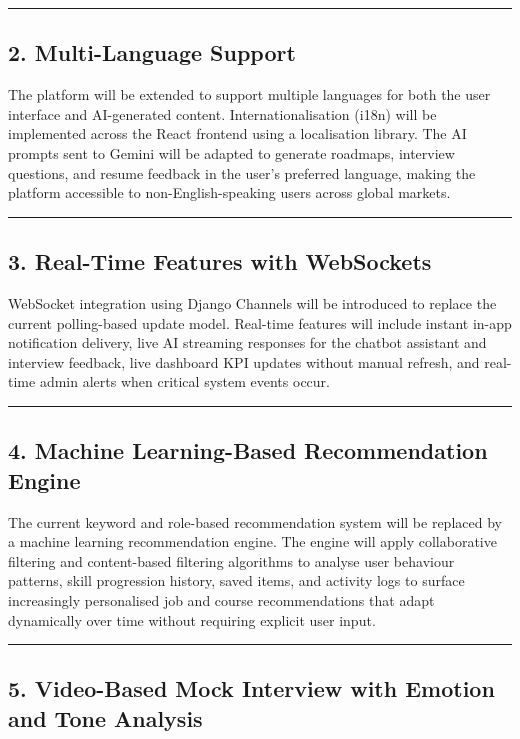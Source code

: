 \documentclass[12pt]{article}
\begin{document}
\noindent\rule{\textwidth}{0.4pt}

\subsection{2. Multi-Language Support}

The platform will be extended to support multiple languages for both the user interface and AI-generated content. Internationalisation (i18n) will be implemented across the React frontend using a localisation library. The AI prompts sent to Gemini will be adapted to generate roadmaps, interview questions, and resume feedback in the user's preferred language, making the platform accessible to non-English-speaking users across global markets.

\noindent\rule{\textwidth}{0.4pt}

\subsection{3. Real-Time Features with WebSockets}

WebSocket integration using Django Channels will be introduced to replace the current polling-based update model. Real-time features will include instant in-app notification delivery, live AI streaming responses for the chatbot assistant and interview feedback, live dashboard KPI updates without manual refresh, and real-time admin alerts when critical system events occur.

\noindent\rule{\textwidth}{0.4pt}

\subsection{4. Machine Learning-Based Recommendation Engine}

The current keyword and role-based recommendation system will be replaced by a machine learning recommendation engine. The engine will apply collaborative filtering and content-based filtering algorithms to analyse user behaviour patterns, skill progression history, saved items, and activity logs to surface increasingly personalised job and course recommendations that adapt dynamically over time without requiring explicit user input.

\noindent\rule{\textwidth}{0.4pt}

\subsection{5. Video-Based Mock Interview with Emotion and Tone Analysis}
\end{document}

